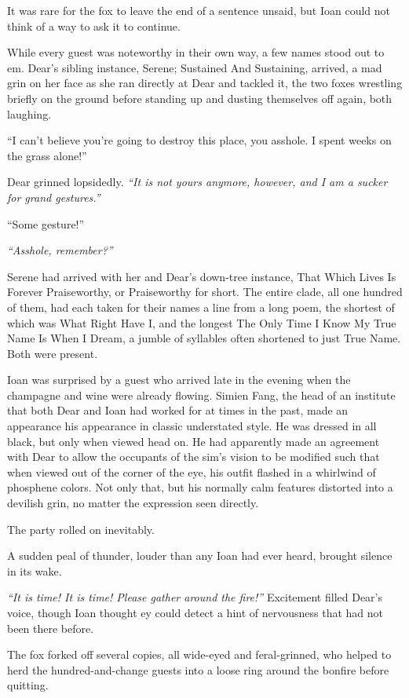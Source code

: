 It was rare for the fox to leave the end of a sentence unsaid, but Ioan could not think of a way to ask it to continue.

While every guest was noteworthy in their own way, a few names stood out to em. Dear's sibling instance, Serene; Sustained And Sustaining, arrived, a mad grin on her face as she ran directly at Dear and tackled it, the two foxes wrestling briefly on the ground before standing up and dusting themselves off again, both laughing.

``I can't believe you're going to destroy this place, you asshole. I spent weeks on the grass alone!''

Dear grinned lopsidedly. \emph{``It is not yours anymore, however, and I am a sucker for grand gestures.''}

``Some gesture!''

\emph{``Asshole, remember?''}

Serene had arrived with her and Dear's down-tree instance, That Which Lives Is Forever Praiseworthy, or Praiseworthy for short. The entire clade, all one hundred of them, had each taken for their names a line from a long poem, the shortest of which was What Right Have I, and the longest The Only Time I Know My True Name Is When I Dream, a jumble of syllables often shortened to just True Name. Both were present.

Ioan was surprised by a guest who arrived late in the evening when the champagne and wine were already flowing. Simien Fang, the head of an institute that both Dear and Ioan had worked for at times in the past, made an appearance his appearance in classic understated style. He was dressed in all black, but only when viewed head on. He had apparently made an agreement with Dear to allow the occupants of the sim's vision to be modified such that when viewed out of the corner of the eye, his outfit flashed in a whirlwind of phosphene colors. Not only that, but his normally calm features distorted into a devilish grin, no matter the expression seen directly.

The party rolled on inevitably.

A sudden peal of thunder, louder than any Ioan had ever heard, brought silence in its wake.

\emph{``It is time! It is time! Please gather around the fire!''} Excitement filled Dear's voice, though Ioan thought ey could detect a hint of nervousness that had not been there before.

The fox forked off several copies, all wide-eyed and feral-grinned, who helped to herd the hundred-and-change guests into a loose ring around the bonfire before quitting.

